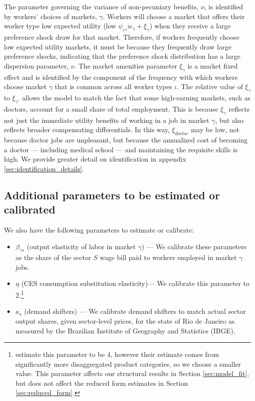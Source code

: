 \documentclass[12pt]{article}
\def\ig{\iota\gamma}
\def\g{\gamma}
\def\i{\iota}
\theoremstyle{definition}
\theoremstyle{plain}
\begin{document}
The parameter governing the variance of non-pecuniary benefits, $\nu$, is identified by workers' choices of markets, $\g$. Workers will choose a market that offers their worker type low expected utility (low $\psi_{\ig} w_{\g} + \xi_{\g}$) when they receive a large preference shock draw for that market. Therefore, if workers frequently choose low expected utility markets, it must be because they frequently draw large preference shocks, indicating that the preference shock distribution has a large dispersion parameter, $\nu$. The market amenities parameter $\xi_{\g}$ is a market fixed effect and is identified by the component of the frequency with which workers choose market $\g$ that is common across all worker types $\i$. The relative value of $\xi_{\g}$ to $\xi_{\g'}$ allows the model to match the fact that some high-earning markets, such as doctors, account for a small share of total employment. This is because  $\xi_{\g}$ reflects not just the immediate utility benefits of working in a job in market $\g$, but also reflects broader compensating differentials. In this way, $\xi_{doctor}$ may be low, not because doctor jobs are unpleasant, but because the annualized cost of becoming a doctor --- including medical school --- and maintaining the requisite skills is high. We provide greater detail on identification in appendix \ref{sec:identification_details}.



\subsection{Additional parameters to be estimated or calibrated}

\label{sec:calibration}

We also have the following parameters to estimate or calibrate:
\begin{itemize}
	\item $\beta_{\g s}$ (output elasticity of labor in market $\g$) ---  We calibrate these parameters as the share of the sector $S$ wage bill paid to workers employed in market $\g$ jobs. %
	\item $\eta$ (CES consumption substitution elasticity)--- We calibrate this parameter to 2.\footnote{\citet{BrodaWeinstein2006} estimate this parameter to be 4, however their estimate comes from significantly more disaggregated product categories, so we choose a smaller value. This parameter affects our structural results in Section \ref{sec:model_fit}, but does not affect the reduced form estimates in Section \ref{sec:reduced_form}.}
	\item $a_s$ (demand shifters) --- We calibrate demand shifters to match actual sector output shares, given sector-level prices, for the state of Rio de Janeiro as measured by the Brazilian Institute of Geography and Statistics (IBGE).
\end{itemize}
\end{document}
